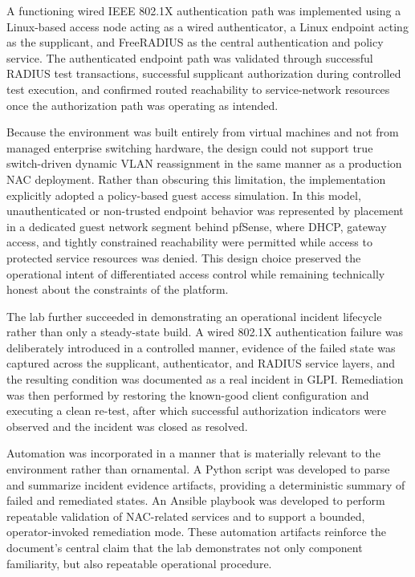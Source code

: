 \documentclass[11pt]{article}
\begin{document}
A functioning wired IEEE 802.1X authentication path was implemented using a Linux-based access node acting as a wired authenticator, a Linux endpoint acting as the supplicant, and FreeRADIUS as the central authentication and policy service. The authenticated endpoint path was validated through successful RADIUS test transactions, successful supplicant authorization during controlled test execution, and confirmed routed reachability to service-network resources once the authorization path was operating as intended.

Because the environment was built entirely from virtual machines and not from managed enterprise switching hardware, the design could not support true switch-driven dynamic VLAN reassignment in the same manner as a production NAC deployment. Rather than obscuring this limitation, the implementation explicitly adopted a policy-based guest access simulation. In this model, unauthenticated or non-trusted endpoint behavior was represented by placement in a dedicated guest network segment behind pfSense, where DHCP, gateway access, and tightly constrained reachability were permitted while access to protected service resources was denied. This design choice preserved the operational intent of differentiated access control while remaining technically honest about the constraints of the platform.

The lab further succeeded in demonstrating an operational incident lifecycle rather than only a steady-state build. A wired 802.1X authentication failure was deliberately introduced in a controlled manner, evidence of the failed state was captured across the supplicant, authenticator, and RADIUS service layers, and the resulting condition was documented as a real incident in GLPI. Remediation was then performed by restoring the known-good client configuration and executing a clean re-test, after which successful authorization indicators were observed and the incident was closed as resolved.

Automation was incorporated in a manner that is materially relevant to the environment rather than ornamental. A Python script was developed to parse and summarize incident evidence artifacts, providing a deterministic summary of failed and remediated states. An Ansible playbook was developed to perform repeatable validation of NAC-related services and to support a bounded, operator-invoked remediation mode. These automation artifacts reinforce the document's central claim that the lab demonstrates not only component familiarity, but also repeatable operational procedure.
\end{document}
